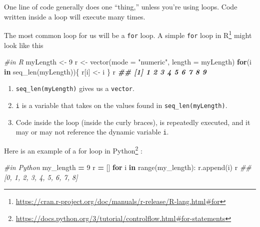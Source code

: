 \documentclass[
  12pt,
  krantz2]{krantz}
\makeatletter
\newenvironment{Shaded}{\begin{snugshade}}{\end{snugshade}}
\newcommand{\AttributeTok}[1]{\textcolor[rgb]{0.61,0.61,0.61}{#1}}
\newcommand{\BuiltInTok}[1]{#1}
\newcommand{\CommentTok}[1]{\textcolor[rgb]{0.37,0.37,0.37}{\textit{#1}}}
\newcommand{\ControlFlowTok}[1]{\textcolor[rgb]{0.27,0.27,0.27}{\textbf{#1}}}
\newcommand{\DecValTok}[1]{\textcolor[rgb]{0.06,0.06,0.06}{#1}}
\newcommand{\DocumentationTok}[1]{\textcolor[rgb]{0.37,0.37,0.37}{\textbf{\textit{#1}}}}
\newcommand{\FunctionTok}[1]{\textcolor[rgb]{0,0,0}{#1}}
\newcommand{\KeywordTok}[1]{\textcolor[rgb]{0.27,0.27,0.27}{\textbf{#1}}}
\newcommand{\NormalTok}[1]{#1}
\newcommand{\OperatorTok}[1]{\textcolor[rgb]{0.43,0.43,0.43}{\textbf{#1}}}
\newcommand{\OtherTok}[1]{\textcolor[rgb]{0.37,0.37,0.37}{#1}}
\newcommand{\StringTok}[1]{\textcolor[rgb]{0.5,0.5,0.5}{#1}}
\providecommand{\tightlist}{%
  \setlength{\itemsep}{0pt}\setlength{\parskip}{0pt}}
\renewcommand{\href}[2]{#2\footnote{\url{#1}}}
\newenvironment{kframe}{%
\medskip{}
\setlength{\fboxsep}{.8em}
 \def\at@end@of@kframe{}%
 \ifinner\ifhmode%
  \def\at@end@of@kframe{\end{minipage}}%
  \begin{minipage}{\columnwidth}%
 \fi\fi%
 \def\FrameCommand##1{\hskip\@totalleftmargin \hskip-\fboxsep
 \colorbox{shadecolor}{##1}\hskip-\fboxsep
     \hskip-\linewidth \hskip-\@totalleftmargin \hskip\columnwidth}%
 \MakeFramed {\advance\hsize-\width
   \@totalleftmargin\z@ \linewidth\hsize
   \@setminipage}}%
 {\par\unskip\endMakeFramed%
 \at@end@of@kframe}
\renewenvironment{Shaded}{\begin{kframe}}{\end{kframe}}
\makeatother
\begin{document}
One line of code generally does one ``thing,'' unless you're using loops. Code written inside a loop will execute many times.

The most common loop for us will be a \texttt{for} loop. A simple \href{https://cran.r-project.org/doc/manuals/r-release/R-lang.html\#for}{\texttt{for} loop in R} might look like this

\begin{Shaded}
\begin{Highlighting}[]
\CommentTok{\#in R}
\NormalTok{myLength }\OtherTok{\textless{}{-}} \DecValTok{9}
\NormalTok{r }\OtherTok{\textless{}{-}} \FunctionTok{vector}\NormalTok{(}\AttributeTok{mode =} \StringTok{"numeric"}\NormalTok{, }\AttributeTok{length =}\NormalTok{ myLength)}
\ControlFlowTok{for}\NormalTok{(i }\ControlFlowTok{in} \FunctionTok{seq\_len}\NormalTok{(myLength))\{}
\NormalTok{    r[i] }\OtherTok{\textless{}{-}}\NormalTok{ i}
\NormalTok{\}}
\NormalTok{r}
\DocumentationTok{\#\# [1] 1 2 3 4 5 6 7 8 9}
\end{Highlighting}
\end{Shaded}

\begin{enumerate}
\def\labelenumi{\arabic{enumi}.}
\tightlist
\item
  \texttt{seq\_len(myLength)} gives us a \texttt{vector}.
\item
  \texttt{i} is a variable that takes on the values found in \texttt{seq\_len(myLength)}.
\item
  Code inside the loop (inside the curly braces), is repeatedly executed, and it may or may not reference the dynamic variable \texttt{i}.
\end{enumerate}

\href{https://docs.python.org/3/tutorial/controlflow.html\#for-statements}{Here is an example of a for loop in Python} \citep{Lutz13}:

\begin{Shaded}
\begin{Highlighting}[]
\CommentTok{\#in Python}
\NormalTok{my\_length }\OperatorTok{=} \DecValTok{9}
\NormalTok{r }\OperatorTok{=}\NormalTok{ []}
\ControlFlowTok{for}\NormalTok{ i }\KeywordTok{in} \BuiltInTok{range}\NormalTok{(my\_length):}
\NormalTok{    r.append(i)}
\NormalTok{r}
\CommentTok{\#\# [0, 1, 2, 3, 4, 5, 6, 7, 8]}
\end{Highlighting}
\end{Shaded}
\end{document}
